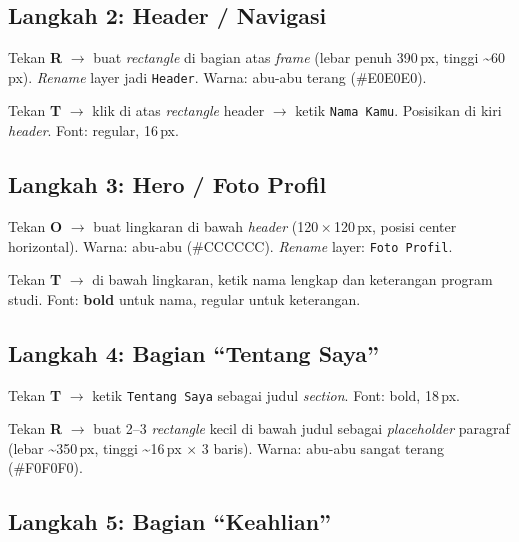 \subsection{Langkah 2: Header / Navigasi}

\begin{langkah}
  \item Tekan \textbf{R} $\rightarrow$ buat \emph{rectangle} di bagian atas \emph{frame} (lebar penuh 390\,px, tinggi \~{}60\,px). \emph{Rename} layer jadi \texttt{Header}. Warna: abu-abu terang (\#E0E0E0).
  \item Tekan \textbf{T} $\rightarrow$ klik di atas \emph{rectangle} header $\rightarrow$ ketik \texttt{Nama Kamu}. Posisikan di kiri \emph{header}. Font: regular, 16\,px.
\end{langkah}

\subsection{Langkah 3: Hero / Foto Profil}

\begin{langkah}
  \item Tekan \textbf{O} $\rightarrow$ buat lingkaran di bawah \emph{header} (120\,$\times$\,120\,px, posisi center horizontal). Warna: abu-abu (\#CCCCCC). \emph{Rename} layer: \texttt{Foto Profil}.
  \item Tekan \textbf{T} $\rightarrow$ di bawah lingkaran, ketik nama lengkap dan keterangan program studi. Font: \textbf{bold} untuk nama, regular untuk keterangan.
\end{langkah}

\subsection{Langkah 4: Bagian ``Tentang Saya''}

\begin{langkah}
  \item Tekan \textbf{T} $\rightarrow$ ketik \texttt{Tentang Saya} sebagai judul \emph{section}. Font: bold, 18\,px.
  \item Tekan \textbf{R} $\rightarrow$ buat 2--3 \emph{rectangle} kecil di bawah judul sebagai \emph{placeholder} paragraf (lebar \~{}350\,px, tinggi \~{}16\,px $\times$ 3 baris). Warna: abu-abu sangat terang (\#F0F0F0).
\end{langkah}

\subsection{Langkah 5: Bagian ``Keahlian''}

